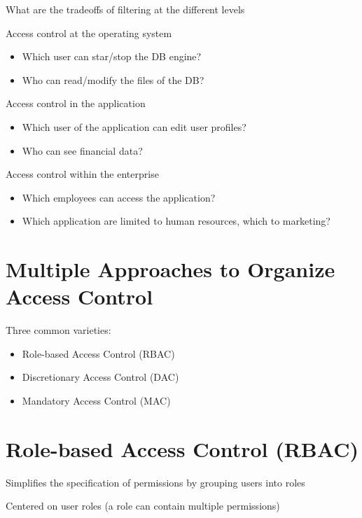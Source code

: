 \documentclass[11pt]{article}
\begin{document}
\begin{tcolorbox}[
  colback=orange!15,     %
  colframe=black!50,    %
  boxrule=1pt,       %
  arc=3mm,             %
  left=4mm, right=4mm, top=2mm, bottom=2mm %
]
What are the tradeoffs of filtering at the different levels
\end{tcolorbox}

Access control at the operating system
\begin{itemize}
	\item Which user can star/stop the DB engine?
	\item Who can read/modify the files of the DB?
\end{itemize}

Access control in the application
\begin{itemize}
	\item Which user of the application can edit user profiles?
	\item Who can see financial data?
\end{itemize}

Access control within the enterprise
\begin{itemize}
	\item Which employees can access the application?
	\item Which application are limited to human resources, which to marketing?
\end{itemize}


\section*{Multiple Approaches to Organize Access Control}

Three common varieties: 
\begin{itemize}
	\item Role-based Access Control (RBAC)
	\item Discretionary Access Control (DAC)
	\item Mandatory Access Control (MAC)
\end{itemize}

\section*{Role-based Access Control (RBAC)}

Simplifies the specification of permissions by grouping users into roles

Centered on user roles (a role can contain multiple permissions)
\end{document}
